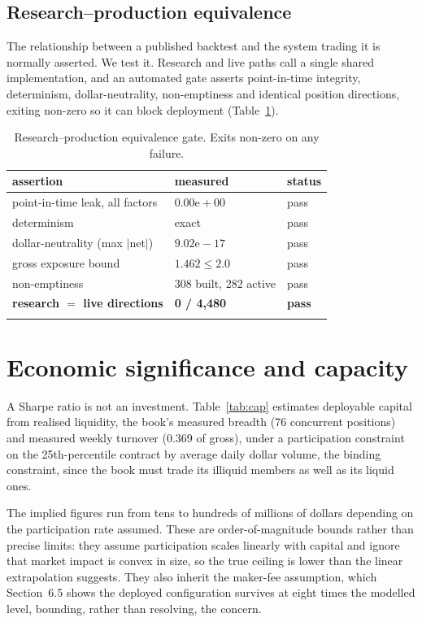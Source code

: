 \documentclass[11pt,letterpaper]{article}
\begin{document}
\subsection{Research--production equivalence}

The relationship between a published backtest and the system trading it is
normally asserted. We test it. Research and live paths call a single shared
implementation, and an automated gate asserts point-in-time integrity,
determinism, dollar-neutrality, non-emptiness and identical position directions,
exiting non-zero so it can block deployment (Table~\ref{tab:gate}).

\begin{table}[!htbp]\centering
\caption{Research--production equivalence gate. Exits non-zero on any failure.}
\label{tab:gate}
\begin{tabular}{lll}
\toprule
assertion & measured & status \\
\midrule\addlinespace[2pt]
point-in-time leak, all factors & $0.00\mathrm{e}{+}00$ & pass \\
determinism & exact & pass \\
dollar-neutrality (max $|$net$|$) & $9.02\mathrm{e}{-}17$ & pass \\
gross exposure bound & $1.462 \le 2.0$ & pass \\
non-emptiness & 308 built, 282 active & pass \\
\textbf{research $=$ live directions} & \textbf{0 / 4{,}480} & \textbf{pass} \\
\addlinespace[2pt]
\bottomrule
\end{tabular}
\end{table}

\section{Economic significance and capacity}

A Sharpe ratio is not an investment. Table~\ref{tab:cap} estimates deployable
capital from realised liquidity, the book's measured breadth (76 concurrent
positions) and measured weekly turnover (0.369 of gross), under a participation
constraint on the 25th-percentile contract by average daily dollar volume, the
binding constraint, since the book must trade its illiquid members as well as its
liquid ones.

The implied figures run from tens to hundreds of millions of dollars depending on
the participation rate assumed. These are order-of-magnitude bounds rather than
precise limits: they assume participation scales linearly with capital and ignore
that market impact is convex in size, so the true ceiling is lower than the linear
extrapolation suggests. They also inherit the maker-fee assumption, which
Section~6.5 shows the deployed configuration survives at eight times the modelled
level, bounding, rather than resolving, the concern.
\end{document}
